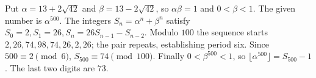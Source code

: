 Put $\alpha=13+2\sqrt{42}$ and $\beta=13-2\sqrt{42}$, so $\alpha\beta=1$ and $0<\beta<1$. The given number is $\alpha^{500}$. The integers $S_n=\alpha^n+\beta^n$ satisfy $S_0=2,S_1=26,S_n=26S_{n-1}-S_{n-2}$. Modulo $100$ the sequence starts $2,26,74,98,74,26,2,26$; the pair repeats, establishing period six. Since $500\equiv2\pmod6$, $S_{500}\equiv74\pmod{100}$. Finally $0<\beta^{500}<1$, so $\lfloor\alpha^{500}\rfloor=S_{500}-1$. The last two digits are $\boxed{73}$.
